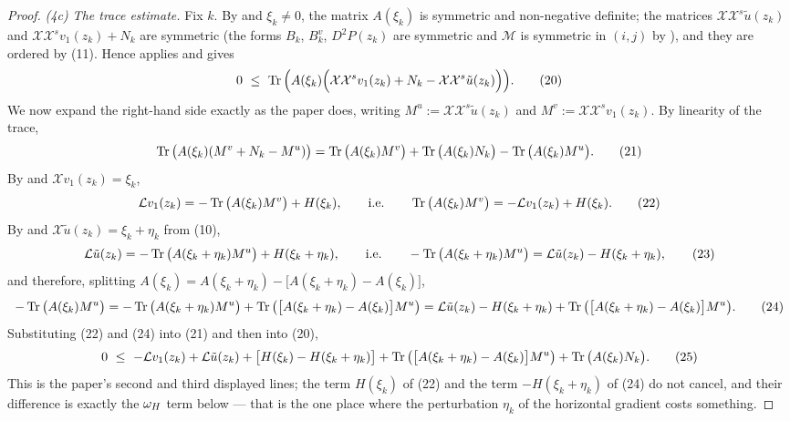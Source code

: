 \begin{proof}
\emph{(4c) The trace estimate.} Fix $k$. By  and
$\xi_k\ne0$, the matrix $A(\xi_k)$ is symmetric and non-negative definite; the matrices
$\mathcal X\mathcal X^{s}\tilde u(z_k)$ and $\mathcal X\mathcal X^{s}v_1(z_k)+N_k$ are
symmetric (the forms $B_k$, $B^{v}_k$, $D^{2}P(z_k)$ are symmetric and $\mathcal M$ is
symmetric in $(i,j)$ by ), and they are ordered by (11). Hence
 applies and gives
\[
 0\ \le\ \operatorname{Tr}\Big(A(\xi_k)\Big(\mathcal X\mathcal X^{s}v_1(z_k)+N_k
 -\mathcal X\mathcal X^{s}\tilde u(z_k)\Big)\Big). \tag{20}
\]
We now expand the right-hand side exactly as the paper does, writing
$M^{u}:=\mathcal X\mathcal X^{s}\tilde u(z_k)$ and $M^{v}:=\mathcal X\mathcal X^{s}v_1(z_k)$.
By linearity of the trace,
\[
 \operatorname{Tr}\big(A(\xi_k)(M^{v}+N_k-M^{u})\big)
 =\operatorname{Tr}\big(A(\xi_k)M^{v}\big)+\operatorname{Tr}\big(A(\xi_k)N_k\big)-\operatorname{Tr}\big(A(\xi_k)M^{u}\big). \tag{21}
\]
By  and $\mathcal Xv_1(z_k)=\xi_k$,
\[
 \mathcal Lv_1(z_k)=-\operatorname{Tr}\big(A(\xi_k)M^{v}\big)+H(\xi_k),
 \qquad\text{i.e.}\qquad
 \operatorname{Tr}\big(A(\xi_k)M^{v}\big)=-\mathcal Lv_1(z_k)+H(\xi_k). \tag{22}
\]
By  and $\mathcal X\tilde u(z_k)=\xi_k+\eta_k$ from (10),
\[
 \mathcal L\tilde u(z_k)=-\operatorname{Tr}\big(A(\xi_k+\eta_k)M^{u}\big)+H(\xi_k+\eta_k),
 \qquad\text{i.e.}\qquad
 -\operatorname{Tr}\big(A(\xi_k+\eta_k)M^{u}\big)=\mathcal L\tilde u(z_k)-H(\xi_k+\eta_k), \tag{23}
\]
and therefore, splitting $A(\xi_k)=A(\xi_k+\eta_k)-\big[A(\xi_k+\eta_k)-A(\xi_k)\big]$,
\[
 -\operatorname{Tr}\big(A(\xi_k)M^{u}\big)
 =-\operatorname{Tr}\big(A(\xi_k+\eta_k)M^{u}\big)+\operatorname{Tr}\big(\big[A(\xi_k+\eta_k)-A(\xi_k)\big]M^{u}\big)
 =\mathcal L\tilde u(z_k)-H(\xi_k+\eta_k)+\operatorname{Tr}\big(\big[A(\xi_k+\eta_k)-A(\xi_k)\big]M^{u}\big).
 \tag{24}
\]
Substituting (22) and (24) into (21) and then into (20),
\[
 0\ \le\ -\mathcal Lv_1(z_k)+\mathcal L\tilde u(z_k)
 +\big[H(\xi_k)-H(\xi_k+\eta_k)\big]
 +\operatorname{Tr}\big(\big[A(\xi_k+\eta_k)-A(\xi_k)\big]M^{u}\big)
 +\operatorname{Tr}\big(A(\xi_k)N_k\big). \tag{25}
\]
This is the paper's second and third displayed lines; the term $H(\xi_k)$ of (22) and the
term $-H(\xi_k+\eta_k)$ of (24) do not cancel, and their difference is exactly the
$\omega_H$ term below --- that is the one place where the perturbation $\eta_k$ of the
horizontal gradient costs something.


\end{proof}
